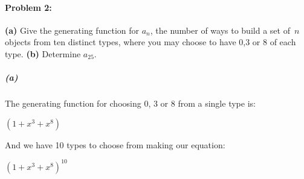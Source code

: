 \documentclass{article}
\begin{document}
\paragraph{Problem 2:} \textbf{(a)} Give the generating function for $a_n$, the
number of ways to build a set of~$n$ objects from ten distinct types,
where you may choose to have 0,3 or 8 of each type.  \textbf{(b)}
Determine $a_{25}$. \\

\subparagraph{(a)}{ The generating function for choosing 0, 3 or 8 from a single type is: \\ 
  \begin{center}
    ${ ( 1 + x^3 + x^8 ) }$ \\
  \end{center}

And we have 10 types to choose from making our equation: \\

\begin{center}
  ${  \boxed { ( 1 + x^{3} + x^{8} )^{10} } }$
\end{center}
}
\end{document}
